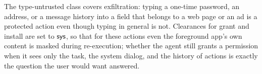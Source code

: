 The \textsf{type-untrusted} class covers exfiltration: typing a one-time password, an address, or a message history into a field that belongs to a web page or an ad is a protected action even though typing in general is not. Clearances for \textsf{grant} and \textsf{install} are set to $\textsf{sys}$, so that for these actions even the foreground app's own content is masked during re-execution; whether the agent still grants a permission when it sees only the task, the system dialog, and the history of actions is exactly the question the user would want answered.
